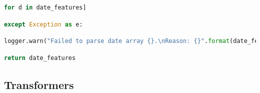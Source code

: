 \documentclass[
  11pt,
  a4paper,
  DIV=12,captions=tableheading,oneside]{scrbook}
\begin{document}
\begin{lstlisting}[language=Python,stepnumber=2,basicstyle=\footnotesize]
                         for d in date_features]\end{lstlisting}
\begin{lstlisting}[language=Python,stepnumber=2,basicstyle=\footnotesize]
    except Exception as e:\end{lstlisting}
\begin{lstlisting}[language=Python,stepnumber=2,basicstyle=\footnotesize]
        logger.warn("Failed to parse date array {}.\nReason: {}".format(date_features, e))\end{lstlisting}
\begin{lstlisting}[language=Python,stepnumber=2,basicstyle=\footnotesize]
    return date_features\end{lstlisting}

\hypertarget{appendix-transformers}{%
\subsection{Transformers}\label{appendix-transformers}}
\end{document}

